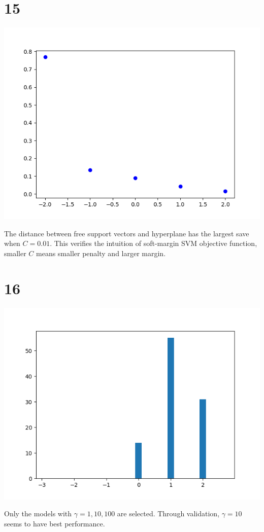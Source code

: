 \documentclass[12pt]{article}
\begin{document}
\section*{15}
\begin{center}
    \includegraphics[scale=0.5]{p15.png}
\end{center}
The distance between free support vectors and hyperplane has the largest save when $C = 0.01$.
This verifies the intuition of soft-margin SVM objective function, 
smaller $C$ means smaller penalty and larger margin.

\section*{16}
\begin{center}
    \includegraphics[scale=0.5]{p16.png}
\end{center}
Only the models with $\gamma = 1, 10, 100$ are selected. Through validation, $\gamma = 10$ seems to have best performance.
\end{document}
